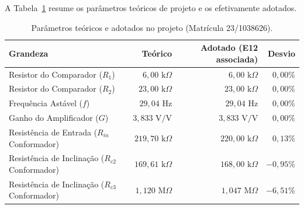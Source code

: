 \documentclass[11pt,a4paper]{article}
\begin{document}
A Tabela~\ref{tab:projeto_cardoso} resume os parâmetros teóricos de projeto e os efetivamente adotados.

\begin{table}[H]
\centering
\caption{Parâmetros teóricos e adotados no projeto (Matrícula 23/1038626).}
\label{tab:projeto_cardoso}
\renewcommand{\arraystretch}{1.2}
\begin{tabular}{@{}lrrr@{}}
\toprule
\textbf{Grandeza} & \textbf{Teórico} & \textbf{Adotado (E12 associada)} & \textbf{Desvio} \\
\midrule
Resistor do Comparador ($R_1$) & $6{,}00\text{ k}\Omega$ & $6{,}00\text{ k}\Omega$ & $0{,}00\%$ \\
Resistor do Comparador ($R_2$) & $23{,}00\text{ k}\Omega$ & $23{,}00\text{ k}\Omega$ & $0{,}00\%$ \\
Frequência Astável ($f$) & $29{,}04\text{ Hz}$ & $29{,}04\text{ Hz}$ & $0{,}00\%$ \\
Ganho do Amplificador ($G$) & $3{,}833\text{ V/V}$ & $3{,}833\text{ V/V}$ & $0{,}00\%$ \\
Resistência de Entrada ($R_{in}$ Conformador) & $219{,}70\text{ k}\Omega$ & $220{,}00\text{ k}\Omega$ & $0{,}13\%$ \\
Resistência de Inclinação ($R_{c2}$ Conformador) & $169{,}61\text{ k}\Omega$ & $168{,}00\text{ k}\Omega$ & $-0{,}95\%$ \\
Resistência de Inclinação ($R_{c3}$ Conformador) & $1{,}120\text{ M}\Omega$ & $1{,}047\text{ M}\Omega$ & $-6{,}51\%$ \\
\bottomrule
\end{tabular}
\end{table}
\end{document}
